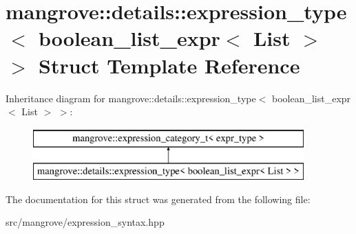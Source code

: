 \hypertarget{structmangrove_1_1details_1_1expression__type_3_01boolean__list__expr_3_01List_01_4_01_4}{}\section{mangrove\+:\+:details\+:\+:expression\+\_\+type$<$ boolean\+\_\+list\+\_\+expr$<$ List $>$ $>$ Struct Template Reference}
\label{structmangrove_1_1details_1_1expression__type_3_01boolean__list__expr_3_01List_01_4_01_4}
Inheritance diagram for mangrove\+:\+:details\+:\+:expression\+\_\+type$<$ boolean\+\_\+list\+\_\+expr$<$ List $>$ $>$\+:\begin{figure}[H]
\begin{center}
\leavevmode
\includegraphics[height=2.000000cm]{structmangrove_1_1details_1_1expression__type_3_01boolean__list__expr_3_01List_01_4_01_4}
\end{center}
\end{figure}


The documentation for this struct was generated from the following file\+:\begin{DoxyCompactItemize}
\item 
src/mangrove/expression\+\_\+syntax.\+hpp\end{DoxyCompactItemize}
